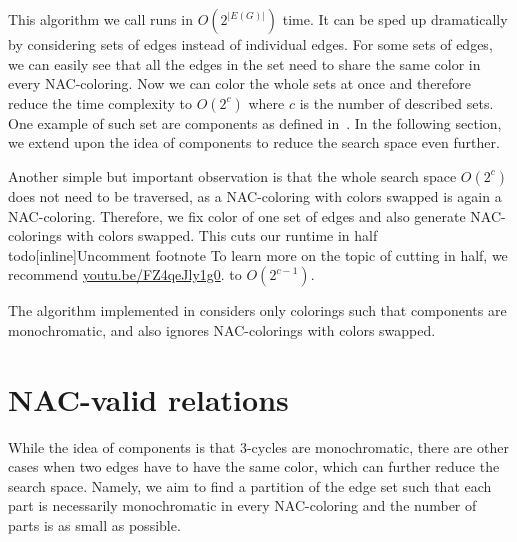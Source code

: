 This algorithm we call \Naive{} runs in \( O(2^{|E(G)|}) \) time.
It can be sped up dramatically by considering sets of edges instead of individual edges.
For some sets of edges, we can easily see that all the edges in the set need to share
the same color in every NAC-coloring.
Now we can color the whole sets at once
and therefore reduce the time complexity to \( O(2^{c}) \)
where \( c \) is the number of described sets.
One example of such set are \trcon{} components
as defined in~.
In the following section, we extend upon the idea of \trcon{} components
to reduce the search space even further.

Another simple but important observation is that the whole search space \( O(2^{c}) \)
does not need to be traversed, as a NAC-coloring with colors swapped is again a NAC-coloring.
Therefore, we fix color of one set of edges and also generate NAC-colorings with colors swapped.
This cuts our runtime in half %
todo[inline]{Uncomment footnote
		To learn more on the topic of cutting in half, we recommend
		\href{https://youtu.be/FZ4qeJly1g0}{youtu.be/FZ4qeJly1g0}.
	}%
to \( O(2^{c-1}) \).


The algorithm implemented in \flexrilog{}
considers only colorings such that \trcon{} components are monochromatic,
and also ignores NAC-colorings with colors swapped.

\section{NAC-valid relations}
\label{sec:NACvalid}

While the idea of \trcon{} components is that 3-cycles are monochromatic,
there are other cases when two edges have to have the same color,
which can further reduce the search space.
Namely, we aim to find a partition of the edge set such that each part is necessarily monochromatic
in every NAC-coloring and the number of parts is as small as possible.

